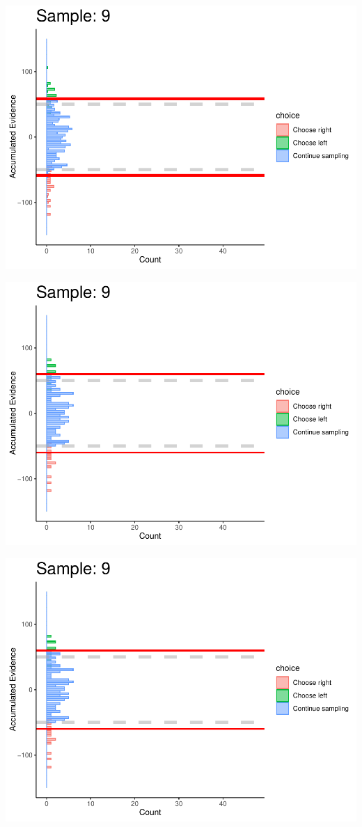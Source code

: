 \documentclass[
]{book}
\begin{document}
\begin{center}\includegraphics[width=0.8\linewidth]{LateNightBayes_files/figure-latex/fixed_dcb-79} \end{center}

\begin{center}\includegraphics[width=0.8\linewidth]{LateNightBayes_files/figure-latex/fixed_dcb-80} \end{center}

\begin{center}\includegraphics[width=0.8\linewidth]{LateNightBayes_files/figure-latex/fixed_dcb-81} \end{center}
\end{document}
